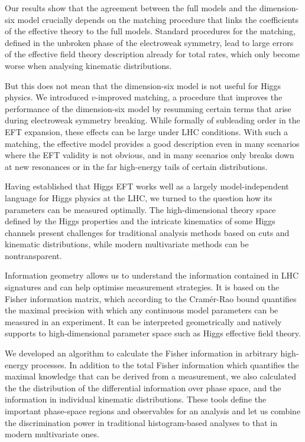 Our results show that the agreement between the full models and the
dimension-six model crucially depends on the matching procedure that
links the coefficients of the effective theory to the full
models. Standard procedures for the matching, defined in the unbroken
phase of the electroweak symmetry, lead to large errors of the
effective field theory description already for total rates, which only
become worse when analysing kinematic distributions.

But this does not mean that the dimension-six model is not useful for
Higgs physics. We introduced $v$-improved matching, a procedure that
improves the performance of the dimension-six model by resumming
certain terms that arise during electroweak symmetry breaking. While
formally of subleading order in the EFT expansion, these effects can
be large under LHC conditions. With such a matching, the effective
model provides a good description even in many scenarios where the EFT
validity is not obvious, and in many scenarios only breaks down at new
resonances or in the far high-energy tails of certain distributions.

\newparagraph
%
Having established that Higgs EFT works well as a largely
model-independent language for Higgs physics at the LHC, we turned to
the question how its parameters can be measured optimally. The
high-dimensional theory space defined by the Higgs properties and the
intricate kinematics of some Higgs channels present challenges for
traditional analysis methods based on cuts and kinematic
distributions, while modern multivariate methods can be nontransparent.

Information geometry allows us to understand the information contained
in LHC signatures and can help optimise measurement strategies. It is
based on the Fisher information matrix, which according to the
Cram\'er-Rao bound quantifies the maximal precision with which any
continuous model parameters can be measured in an experiment. It can be
interpreted geometrically and natively supports to high-dimensional
parameter space such as Higgs effective field theory.

We developed an algorithm to calculate the Fisher information in
arbitrary high-energy processes. In addition to the total Fisher
information which quantifies the maximal knowledge that can be derived
from a measurement, we also calculated the the distribution of the
differential information over phase space, and the information in
individual kinematic distributions. These tools define the important
phase-space regions and observables for an analysis and let us combine
the discrimination power in traditional histogram-based analyses to
that in modern multivariate ones.


